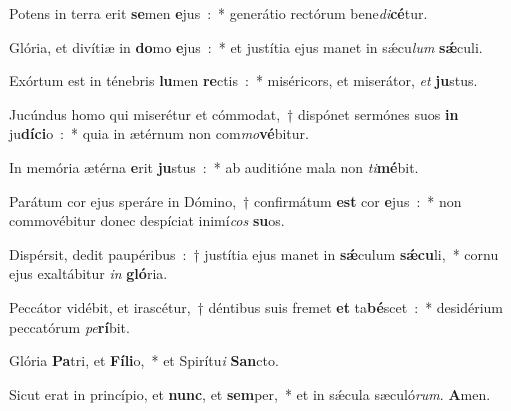 ﻿\item Potens in terra erit \textbf{se}\-men \textbf{e}jus~:~* generátio rectórum bene\textit{di}\textbf{cé}tur.
\item Glória, et divítiæ in \textbf{do}\-mo \textbf{e}jus~:~* et justítia ejus manet in sǽcu\-\textit{lum} \textbf{sǽ}culi.
\item Exórtum est in ténebris \textbf{lu}\-men \textbf{re}\-ctis~:~* miséricors, et miserátor, \textit{et} \textbf{ju}stus.
\item Jucúndus homo qui miserétur et cómmodat,~† dispónet sermónes suos \textbf{in} ju\textbf{dí}\-\textbf{ci}\-o~:~* quia in ætérnum non com\textit{mo}\textbf{vé}bitur.
\item In memória ætérna \textbf{e}\-rit \textbf{ju}\-stus~:~* ab auditióne mala non \textit{ti}\textbf{mé}bit.
\item Parátum cor ejus speráre in Dómino,~† confirmátum \textbf{est} cor \textbf{e}jus~:~* non commovébitur donec despíciat inimí\textit{cos} \textbf{su}os.
\item Dispérsit, dedit paupéribus~:~† justítia ejus manet in \textbf{sǽ}\-culum \textbf{sǽ}\-\textbf{cu}\-li,~* cornu ejus exaltábitur \textit{in} \textbf{gló}ria.
\item Peccátor vidébit, et irascétur,~† déntibus suis fremet \textbf{et} ta\textbf{bé}\-scet~:~* desidérium peccatórum \textit{pe}\textbf{rí}bit.
\item Glória \textbf{Pa}\-tri, et \textbf{Fí}\-\textbf{li}\-o,~* et Spirítu\-\textit{i} \textbf{San}cto.
\item Sicut erat in princípio, et \textbf{nunc}, et \textbf{sem}\-per,~* et in sǽcula sæculó\-\textit{rum}. \textbf{A}men.